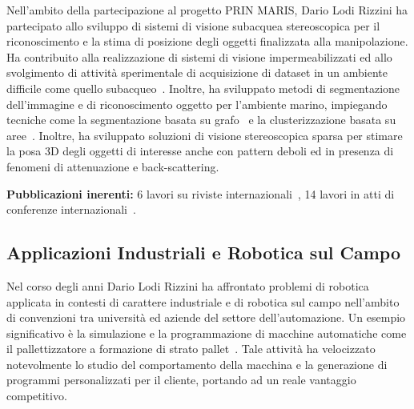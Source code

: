\documentclass[11pt]{article}
\begin{document}
Nell'ambito della partecipazione al progetto PRIN MARIS,
Dario Lodi Rizzini ha partecipato allo sviluppo di sistemi di visione subacquea stereoscopica 
per il riconoscimento e la stima di posizione degli oggetti finalizzata alla manipolazione. 
Ha contribuito alla realizzazione di sistemi di visione impermeabilizzati ed allo svolgimento
di attivit\`a sperimentale di acquisizione di dataset in un ambiente difficile come quello 
subacqueo~\cite{oleari2014ifac,oleari2015oceans}.
Inoltre, ha sviluppato metodi di segmentazione dell'immagine e di riconoscimento oggetto per l'ambiente marino, 
impiegando tecniche come la segmentazione basata su grafo~\cite{kallasi2015oceans} e 
la clusterizzazione basata su aree~\cite{lodirizzini2015ijars,oleari2014ifac,kallasi2014amra}.
Inoltre, ha sviluppato soluzioni di visione stereoscopica sparsa per stimare la posa 3D 
degli oggetti di interesse anche con pattern deboli ed in presenza di fenomeni di attenuazione 
e back-scattering. 


\textbf{Pubblicazioni inerenti:}
6 lavori su riviste internazionali~\cite{aleotti2021ap, simetti2018joe,lodirizzini2017caee,casalino2016mtsj,lodirizzini2015ijars,aleotti2014jirs},
14 lavori in atti di conferenze internazionali~\cite{fontana2021ecmr, fontana2021iccp, monica2020irc, chiaravalli2020etfa, oleari2016iecon, kallasi2015oceans, oleari2015oceans, aleotti2014iros, oleari2014ifac, lodirizzini2014ias, kallasi2014iarp, oleari2013iccp, aleotti2012icra, kallasi2014amra}.

\subsection*{Applicazioni Industriali e Robotica sul Campo}

Nel corso degli anni Dario Lodi Rizzini ha affrontato problemi di robotica applicata in contesti 
di carattere industriale e di robotica sul campo nell'ambito di convenzioni tra universit\`a 
ed aziende del settore dell'automazione. 
Un esempio significativo \`e la simulazione e la programmazione di macchine automatiche 
come il pallettizzatore a formazione di strato pallet~\cite{argenti2010isr,calo2012icinco}. 
Tale attivit\`a ha velocizzato notevolmente lo studio del comportamento della macchina e 
la generazione di programmi personalizzati per il cliente, portando ad un reale vantaggio competitivo. 
\end{document}
